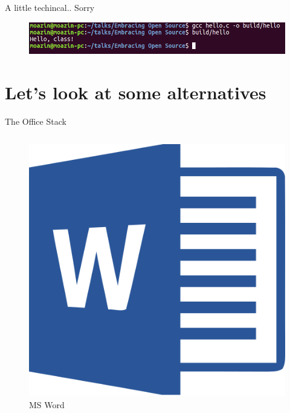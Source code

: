 \documentclass[10pt]{beamer}
\begin{document}
    \begin{frame}{A little techincal.. Sorry}
        
        \begin{figure}
            \centering
            \includegraphics[width=1\textwidth]{images/build}
        \end{figure}
    \end{frame}

    \section{Let's look at some alternatives}
    \begin{frame}{The Office Stack}
        \begin{columns}
            \begin{column}{0.33\textwidth}
                \begin{figure}
                    \centering
                    \includegraphics[height=0.1\paperheight]{images/word}
                    \caption{MS Word}
                \end{figure}
                \begin{figure}

\end{figure}
\end{column}
\end{columns}
\end{frame}
\end{document}
